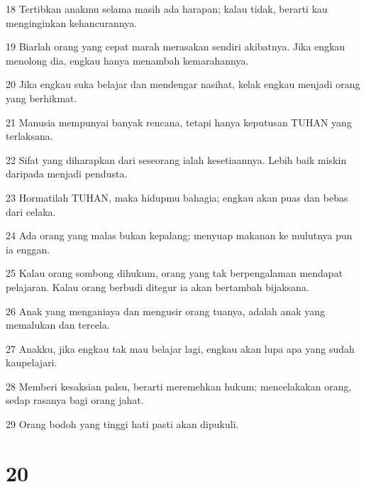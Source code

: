 \par 18 Tertibkan anakmu selama masih ada harapan; kalau tidak, berarti kau menginginkan kehancurannya.
\par 19 Biarlah orang yang cepat marah merasakan sendiri akibatnya. Jika engkau menolong dia, engkau hanya menambah kemarahannya.
\par 20 Jika engkau suka belajar dan mendengar nasihat, kelak engkau menjadi orang yang berhikmat.
\par 21 Manusia mempunyai banyak rencana, tetapi hanya keputusan TUHAN yang terlaksana.
\par 22 Sifat yang diharapkan dari seseorang ialah kesetiaannya. Lebih baik miskin daripada menjadi pendusta.
\par 23 Hormatilah TUHAN, maka hidupmu bahagia; engkau akan puas dan bebas dari celaka.
\par 24 Ada orang yang malas bukan kepalang; menyuap makanan ke mulutnya pun ia enggan.
\par 25 Kalau orang sombong dihukum, orang yang tak berpengalaman mendapat pelajaran. Kalau orang berbudi ditegur ia akan bertambah bijaksana.
\par 26 Anak yang menganiaya dan mengusir orang tuanya, adalah anak yang memalukan dan tercela.
\par 27 Anakku, jika engkau tak mau belajar lagi, engkau akan lupa apa yang sudah kaupelajari.
\par 28 Memberi kesaksian palsu, berarti meremehkan hukum; mencelakakan orang, sedap rasanya bagi orang jahat.
\par 29 Orang bodoh yang tinggi hati pasti akan dipukuli.

\chapter{20}


